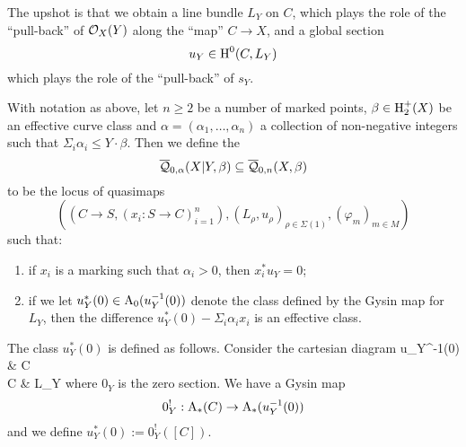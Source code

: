 The upshot is that we obtain a line bundle $L_Y$ on $C$, which plays the role of the ``pull-back'' of $\mathcal{O}_X(Y)$ along the ``map'' $C \to X$, and a global section
\begin{equation*} u_Y \in \operatorname{H}^0(C,L_Y) \end{equation*}
which plays the role of the ``pull-back'' of $s_Y$.

\begin{definition} With notation as above, let $n \geq 2$ be a number of marked points, $\beta \in \operatorname{H}_2^+(X)$ be an effective curve class and $\alpha=(\alpha_1, \ldots, \alpha_n)$ a collection of non-negative integers such that $\Sigma_i \alpha_i \leq Y \cdot \beta$. Then we define the 
\begin{equation*} \overline{\mathcal Q}_{0,\alpha}(X|Y,\beta) \subseteq \overline{\mathcal Q}_{0,n}(X,\beta) \end{equation*}
to be the locus of quasimaps
\begin{equation*} ((C \to S, (x_i : S \to C)_{i=1}^n), (L_\rho,u_\rho)_{\rho \in \Sigma(1)}, (\varphi_m)_{m \in M}) \end{equation*}
such that:
\begin{enumerate}
\item if $x_i$ is a marking such that $\alpha_i > 0$, then $x_i^* u_Y = 0$;
\item if we let $u_Y^*(0) \in \operatorname{A}_0(u_Y^{-1}(0))$ denote the class defined by the Gysin map for $L_Y$, then the difference $u_Y^*(0) - \Sigma_i \alpha_i x_i$ is an effective class.
\end{enumerate}
\end{definition}

The class $u_Y^*(0)$ is defined as follows. Consider the cartesian diagram
\bcd
u_Y^{-1}(0) \ar[r] \ar[d]  & C \ar[d,"u_Y"] \\
C \ar[r,"0_Y"] & L_Y
\ecd
where $0_Y$ is the zero section. We have a Gysin map
\begin{equation*} 0_Y^! : \operatorname{A}_*(C) \rightarrow \operatorname{A}_*(u_Y^{-1}(0)) \end{equation*}
and we define $u_Y^*(0) := 0_Y^!([C])$.


